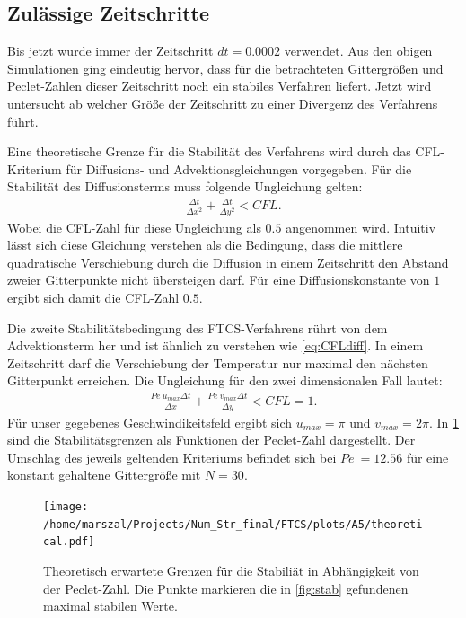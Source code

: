 \subsection{Zulässige Zeitschritte}
Bis jetzt wurde immer der Zeitschritt $dt=0.0002$ verwendet. Aus den obigen Simulationen ging eindeutig hervor, dass für die betrachteten Gittergrößen und Peclet-Zahlen dieser Zeitschritt noch ein stabiles Verfahren liefert.
Jetzt wird untersucht ab welcher Größe der Zeitschritt zu einer Divergenz des Verfahrens führt.

Eine theoretische Grenze für die Stabilität des Verfahrens wird durch das CFL-Kriterium für Diffusions- und Advektionsgleichungen vorgegeben.
Für die Stabilität des Diffusionsterms muss folgende Ungleichung gelten:
\begin{align}
  \frac{\Delta t}{\Delta x^2}+\frac{\Delta t}{\Delta y^2} < CFL. \label{eq:CFLdiff}
\end{align}
Wobei die CFL-Zahl für diese Ungleichung als $0.5$ angenommen wird. Intuitiv lässt sich diese Gleichung verstehen als die Bedingung, dass die mittlere quadratische Verschiebung durch die Diffusion in einem Zeitschritt den Abstand zweier Gitterpunkte nicht übersteigen darf. Für eine Diffusionskonstante von $1$ ergibt sich damit die CFL-Zahl $0.5$.

Die zweite Stabilitätsbedingung des FTCS-Verfahrens rührt von dem Advektionsterm her und ist ähnlich zu verstehen wie \cref{eq:CFLdiff}. In einem Zeitschritt darf die Verschiebung der Temperatur nur maximal den nächsten Gitterpunkt erreichen.
Die Ungleichung für den zwei dimensionalen Fall lautet:
\begin{align}
  \frac{Pe~u_{max} \Delta t}{\Delta x} +\frac{Pe~v_{max} \Delta t}{\Delta y}  < CFL = 1. \label{eq:CFLAdv}
\end{align}
Für unser gegebenes Geschwindikeitsfeld ergibt sich $u_{max} = \pi$ und $v_{max} = 2\pi$. In \cref{fig:CFL} sind die Stabilitätsgrenzen als Funktionen der Peclet-Zahl dargestellt. Der Umschlag des jeweils geltenden Kriteriums befindet sich bei $Pe~=12.56$ für eine konstant gehaltene Gittergröße mit $N=30$.
\begin{figure}
  \centering
  \texttt{[image: /home/marszal/Projects/Num\_Str\_final/FTCS/plots/A5/theoretical.pdf]}
  \caption{Theoretisch erwartete Grenzen für die Stabiliät in Abhängigkeit von der Peclet-Zahl. Die Punkte markieren die in \cref{fig:stab} gefundenen maximal stabilen Werte.}\label{fig:CFL}
\end{figure}


